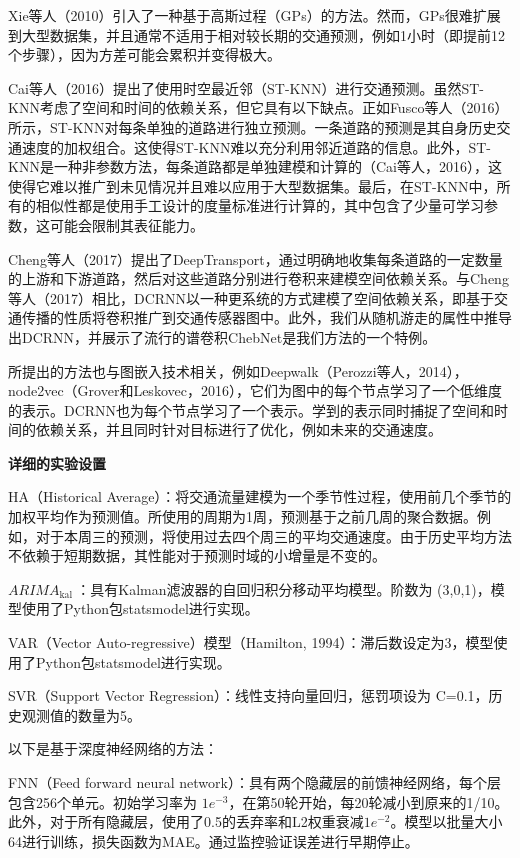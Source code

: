 \documentclass[10.5pt,compsoc,UTF8]{CjC}
\theoremstyle{mystyle}
\begin{document}
Xie等人（2010）引入了一种基于高斯过程（GPs）的方法。然而，GPs很难扩展到大型数据集，并且通常不适用于相对较长期的交通预测，例如1小时（即提前12个步骤），因为方差可能会累积并变得极大。

Cai等人（2016）提出了使用时空最近邻（ST-KNN）进行交通预测。虽然ST-KNN考虑了空间和时间的依赖关系，但它具有以下缺点。正如Fusco等人（2016）所示，ST-KNN对每条单独的道路进行独立预测。一条道路的预测是其自身历史交通速度的加权组合。这使得ST-KNN难以充分利用邻近道路的信息。此外，ST-KNN是一种非参数方法，每条道路都是单独建模和计算的（Cai等人，2016），这使得它难以推广到未见情况并且难以应用于大型数据集。最后，在ST-KNN中，所有的相似性都是使用手工设计的度量标准进行计算的，其中包含了少量可学习参数，这可能会限制其表征能力。

Cheng等人（2017）提出了DeepTransport，通过明确地收集每条道路的一定数量的上游和下游道路，然后对这些道路分别进行卷积来建模空间依赖关系。与Cheng等人（2017）相比，DCRNN以一种更系统的方式建模了空间依赖关系，即基于交通传播的性质将卷积推广到交通传感器图中。此外，我们从随机游走的属性中推导出DCRNN，并展示了流行的谱卷积ChebNet是我们方法的一个特例。

所提出的方法也与图嵌入技术相关，例如Deepwalk（Perozzi等人，2014），node2vec（Grover和Leskovec，2016），它们为图中的每个节点学习了一个低维度的表示。DCRNN也为每个节点学习了一个表示。学到的表示同时捕捉了空间和时间的依赖关系，并且同时针对目标进行了优化，例如未来的交通速度。


\textbf{详细的实验设置}

HA（Historical Average）：将交通流量建模为一个季节性过程，使用前几个季节的加权平均作为预测值。所使用的周期为1周，预测基于之前几周的聚合数据。例如，对于本周三的预测，将使用过去四个周三的平均交通速度。由于历史平均方法不依赖于短期数据，其性能对于预测时域的小增量是不变的。

$ARIMA _{\text {kal }}$：具有Kalman滤波器的自回归积分移动平均模型。阶数为 (3,0,1)，模型使用了Python包statsmodel进行实现。

VAR（Vector Auto-regressive）模型（Hamilton, 1994）：滞后数设定为3，模型使用了Python包statsmodel进行实现。

SVR（Support Vector Regression）：线性支持向量回归，惩罚项设为 C=0.1，历史观测值的数量为5。

以下是基于深度神经网络的方法：

FNN（Feed forward neural network）：具有两个隐藏层的前馈神经网络，每个层包含256个单元。初始学习率为 $1e^{-3}$，在第50轮开始，每20轮减小到原来的1/10。此外，对于所有隐藏层，使用了0.5的丢弃率和L2权重衰减$1e^{-2}$。模型以批量大小64进行训练，损失函数为MAE。通过监控验证误差进行早期停止。
\end{document}
